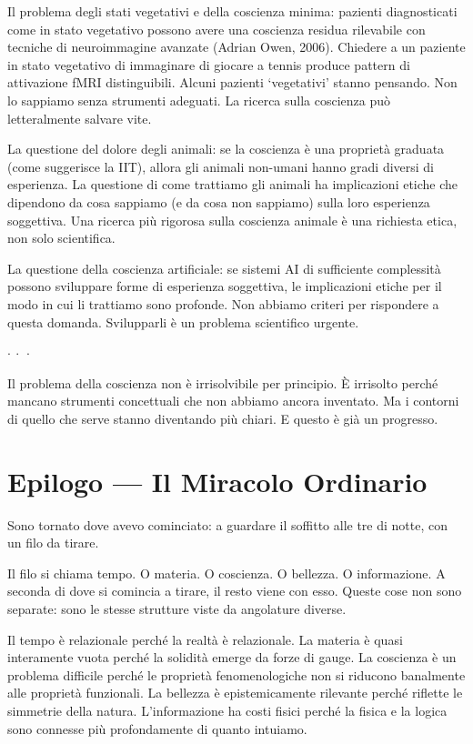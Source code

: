 \documentclass[12pt,a4paper,openany]{book}
\newcommand{\puntini}{\begin{center}$\cdot\ \cdot\ \cdot$\end{center}\vspace{0.3em}}
\begin{document}
Il problema degli stati vegetativi e della coscienza minima: pazienti diagnosticati come in stato vegetativo possono avere una coscienza residua rilevabile con tecniche di neuroimmagine avanzate (Adrian Owen, 2006). Chiedere a un paziente in stato vegetativo di immaginare di giocare a tennis produce pattern di attivazione fMRI distinguibili. Alcuni pazienti `vegetativi' stanno pensando. Non lo sappiamo senza strumenti adeguati. La ricerca sulla coscienza può letteralmente salvare vite.

La questione del dolore degli animali: se la coscienza è una proprietà graduata (come suggerisce la IIT), allora gli animali non-umani hanno gradi diversi di esperienza. La questione di come trattiamo gli animali ha implicazioni etiche che dipendono da cosa sappiamo (e da cosa non sappiamo) sulla loro esperienza soggettiva. Una ricerca più rigorosa sulla coscienza animale è una richiesta etica, non solo scientifica.

La questione della coscienza artificiale: se sistemi AI di sufficiente complessità possono sviluppare forme di esperienza soggettiva, le implicazioni etiche per il modo in cui li trattiamo sono profonde. Non abbiamo criteri per rispondere a questa domanda. Svilupparli è un problema scientifico urgente.

\puntini

Il problema della coscienza non è irrisolvibile per principio. È irrisolto perché mancano strumenti concettuali che non abbiamo ancora inventato. Ma i contorni di quello che serve stanno diventando più chiari. E questo è già un progresso.

\chapter*{Epilogo --- Il Miracolo Ordinario}

Sono tornato dove avevo cominciato: a guardare il soffitto alle tre di notte, con un filo da tirare.

Il filo si chiama tempo. O materia. O coscienza. O bellezza. O informazione. A seconda di dove si comincia a tirare, il resto viene con esso. Queste cose non sono separate: sono le stesse strutture viste da angolature diverse.

Il tempo è relazionale perché la realtà è relazionale. La materia è quasi interamente vuota perché la solidità emerge da forze di gauge. La coscienza è un problema difficile perché le proprietà fenomenologiche non si riducono banalmente alle proprietà funzionali. La bellezza è epistemicamente rilevante perché riflette le simmetrie della natura. L'informazione ha costi fisici perché la fisica e la logica sono connesse più profondamente di quanto intuiamo.
\end{document}

